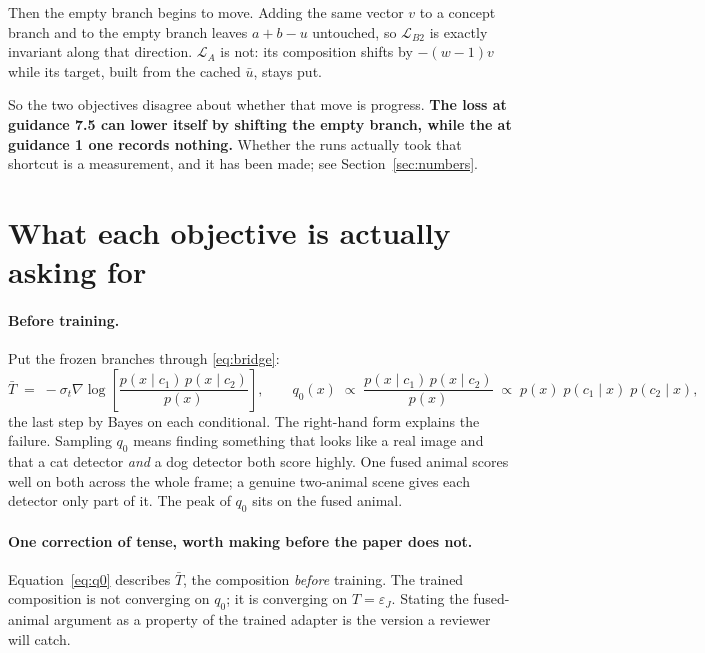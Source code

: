 \documentclass[11pt]{article}
\newcommand{\eps}{\varepsilon}
\begin{document}
Then the empty branch begins to move. Adding the same vector $v$ to a concept branch and to the
empty branch leaves $a+b-u$ untouched, so $\mathcal{L}_{B2}$ is exactly invariant along that
direction. $\mathcal{L}_A$ is not: its composition shifts by $-(w-1)v$ while its target, built from
the cached $\bar u$, stays put.

So the two objectives disagree about whether that move is progress. \textbf{The loss at guidance 7.5 can
lower itself by shifting the empty branch, while the at guidance 1 one records nothing.} Whether the
runs actually took that shortcut is a measurement, and it has been made; see
Section~\ref{sec:numbers}.

\section{What each objective is actually asking for}
\label{sec:asking}

\paragraph{Before training.}
Put the frozen branches through \eqref{eq:bridge}:
\begin{equation}
  \bar T \;=\; -\sigma_t \nabla \log\!\left[\frac{p(x\mid c_1)\,p(x\mid c_2)}{p(x)}\right],
  \qquad
  q_0(x) \;\propto\; \frac{p(x\mid c_1)\,p(x\mid c_2)}{p(x)}
  \;\propto\; p(x)\;p(c_1\mid x)\;p(c_2\mid x),
  \label{eq:q0}
\end{equation}
the last step by Bayes on each conditional. The right-hand form explains the failure. Sampling
$q_0$ means finding something that looks like a real image and that a cat detector \emph{and} a dog
detector both score highly. One fused animal scores well on both across the whole frame; a genuine
two-animal scene gives each detector only part of it. The peak of $q_0$ sits on the fused animal.

\paragraph{One correction of tense, worth making before the paper does not.}
Equation~\eqref{eq:q0} describes $\bar T$, the composition \emph{before} training. The trained
composition is not converging on $q_0$; it is converging on $T = \eps_J$. Stating the fused-animal
argument as a property of the trained adapter is the version a reviewer will catch.
\end{document}
